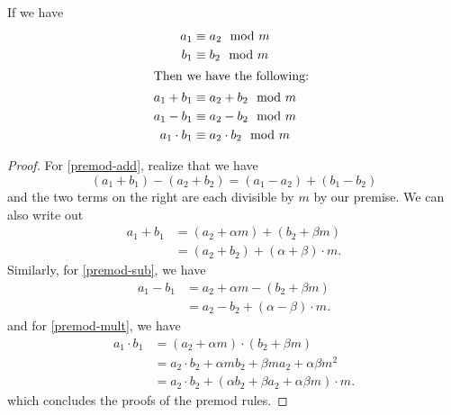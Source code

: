 \begin{proposition}
    If we have
    \begin{align}
        a_1          & \equiv a_2\mod{m} \nonumber                    \\
        b_1          & \equiv b_2\mod{m} \nonumber                    \\
        \intertext{Then we have the following: }
        a_1 + b_1    & \equiv a_2 + b_2\mod{m} \label{premod-add}     \\
        a_1 - b_1    & \equiv a_2 - b_2\mod{m} \label{premod-sub}     \\
        a_1\cdot b_1 & \equiv a_2\cdot b_2\mod{m} \label{premod-mult}
    \end{align}
\end{proposition}
\begin{proof}
    For \cref{premod-add}, realize that we have
    \[(a_1 + b_1) - (a_2 + b_2) = (a_1 - a_2) + (b_1 - b_2)\]
    and the two terms on the right are each divisible by $m$ by our premise. We can also write out
    \begin{align*}
        a_1 + b_1 & = (a_2 + \alpha m) + (b_2 + \beta m)     \\
                  & = (a_2 + b_2) + (\alpha + \beta)\cdot m.
    \end{align*}
    Similarly, for \cref{premod-sub}, we have
    \begin{align*}
        a_1 - b_1 & = a_2 + \alpha m - (b_2 + \beta m)      \\
                  & = a_2 - b_2 + (\alpha - \beta) \cdot m.
    \end{align*}
    and for \cref{premod-mult}, we have
    \begin{align*}
        a_1\cdot b_1 & = (a_2 + \alpha m)\cdot (b_2 + \beta m)                           \\
                     & = a_2\cdot b_2 + \alpha m b_2 + \beta m a_2 + \alpha\beta m^2     \\
                     & = a_2\cdot b_2 + (\alpha b_2 + \beta a_2 + \alpha\beta m)\cdot m.
    \end{align*}
    which concludes the proofs of the premod rules.
\end{proof}


